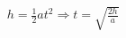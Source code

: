 \documentclass[preview]{standalone}
\begin{document}
\begin{align*}
h = \frac{1}{2} a t^2 \Rightarrow t = \sqrt{\frac{2h}{a}}
\end{align*}
\end{document}

